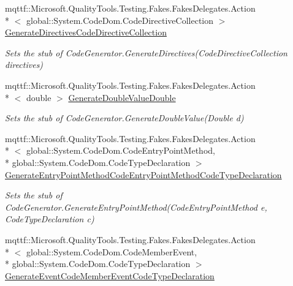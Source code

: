 \begin{DoxyCompactItemize}
mqttf\-::\-Microsoft.\-Quality\-Tools.\-Testing.\-Fakes.\-Fakes\-Delegates.\-Action\\*
$<$ global\-::\-System.\-Code\-Dom.\-Code\-Directive\-Collection $>$ \hyperlink{class_system_1_1_code_dom_1_1_compiler_1_1_fakes_1_1_stub_code_generator_a2529d061e7d1e8a8ceb52e72aedee474}{Generate\-Directives\-Code\-Directive\-Collection}
\begin{DoxyCompactList}\small\item\em Sets the stub of Code\-Generator.\-Generate\-Directives(\-Code\-Directive\-Collection directives)\end{DoxyCompactList}\item 
mqttf\-::\-Microsoft.\-Quality\-Tools.\-Testing.\-Fakes.\-Fakes\-Delegates.\-Action\\*
$<$ double $>$ \hyperlink{class_system_1_1_code_dom_1_1_compiler_1_1_fakes_1_1_stub_code_generator_a7b6d2683016aaf06445674e070a66536}{Generate\-Double\-Value\-Double}
\begin{DoxyCompactList}\small\item\em Sets the stub of Code\-Generator.\-Generate\-Double\-Value(\-Double d)\end{DoxyCompactList}\item 
mqttf\-::\-Microsoft.\-Quality\-Tools.\-Testing.\-Fakes.\-Fakes\-Delegates.\-Action\\*
$<$ global\-::\-System.\-Code\-Dom.\-Code\-Entry\-Point\-Method, \\*
global\-::\-System.\-Code\-Dom.\-Code\-Type\-Declaration $>$ \hyperlink{class_system_1_1_code_dom_1_1_compiler_1_1_fakes_1_1_stub_code_generator_a69ed4deb3eb2157e9188b28fbc1cc63c}{Generate\-Entry\-Point\-Method\-Code\-Entry\-Point\-Method\-Code\-Type\-Declaration}
\begin{DoxyCompactList}\small\item\em Sets the stub of Code\-Generator.\-Generate\-Entry\-Point\-Method(\-Code\-Entry\-Point\-Method e, Code\-Type\-Declaration c)\end{DoxyCompactList}\item 
mqttf\-::\-Microsoft.\-Quality\-Tools.\-Testing.\-Fakes.\-Fakes\-Delegates.\-Action\\*
$<$ global\-::\-System.\-Code\-Dom.\-Code\-Member\-Event, \\*
global\-::\-System.\-Code\-Dom.\-Code\-Type\-Declaration $>$ \hyperlink{class_system_1_1_code_dom_1_1_compiler_1_1_fakes_1_1_stub_code_generator_a7804e88dd48a312bd6b4e0d25612222b}{Generate\-Event\-Code\-Member\-Event\-Code\-Type\-Declaration}

\end{DoxyCompactItemize}
